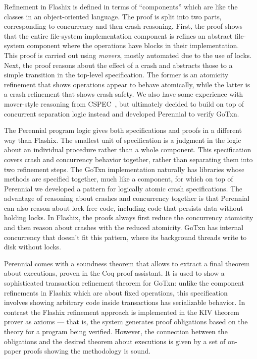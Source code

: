 Refinement in Flashix is defined in terms of
``components'' which are like the classes in an object-oriented language. The
proof is split into two parts,
corresponding to concurrency and then crash reasoning. First, the proof shows
that the entire file-system implementation component is refines an abstract
file-system component where the operations have  blocks in their
implementation. This proof is carried out using \emph{movers},
mostly automated due to the use of locks. Next, the proof reasons
about the effect of a crash and abstracts those to a simple transition in the
top-level specification. The former is an atomicity refinement that shows
operations appear to behave atomically, while the latter is a crash refinement
that shows crash safety. We also have some experience with mover-style reasoning
from CSPEC~\cite{chajed:cspec}, but ultimately decided to build on top of
concurrent separation logic instead and developed Perennial to verify GoTxn.

The Perennial program logic gives both specifications and proofs in a different
way than Flashix. The smallest unit of specification is a judgment in the logic about an
individual procedure rather than a whole component. This specification covers
crash and concurrency behavior together, rather than separating them into two refinement
steps. The GoTxn implementation naturally has libraries whose methods are
specified together, much like a component, for which on top of Perennial we
developed a pattern for logically atomic crash specifications. The advantage of
reasoning about crashes and concurrency together is that Perennial can also
reason about lock-free code, including code that persists data without holding
locks. In Flashix, the proofs always first reduce the concurrency atomicity and
then reason about crashes with the reduced atomicity. GoTxn has internal
concurrency that doesn't fit this pattern, where its background threads write to
disk without locks.

Perennial comes with a soundness theorem that allows to extract a final theorem
about executions, proven in the Coq proof assistant. It is used to show a
sophisticated transaction refinement theorem for GoTxn: unlike the component
refinements in Flashix which are about fixed operations, this specification
involves showing arbitrary code inside transactions has serializable behavior.
In contrast the Flashix refinement approach is implemented in the KIV theorem
prover as axioms --- that is, the system generates proof obligations based on
the theory for a program being verified. However, the connection between the
obligations and the desired theorem about executions is given by a set of
on-paper proofs showing the methodology is sound.

